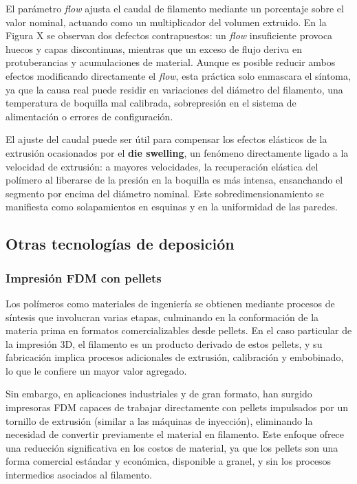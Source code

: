 El parámetro \textit{flow} ajusta el caudal de filamento mediante un porcentaje sobre el valor nominal, actuando como un multiplicador del volumen extruido. En la Figura X se observan dos defectos contrapuestos: un \textit{flow} insuficiente provoca huecos y capas discontinuas, mientras que un exceso de flujo deriva en protuberancias y acumulaciones de material. Aunque es posible reducir ambos efectos modificando directamente el \textit{flow}, esta práctica solo enmascara el síntoma, ya que la causa real puede residir en variaciones del diámetro del filamento, una temperatura de boquilla mal calibrada, sobrepresión en el sistema de alimentación o errores de configuración.

El ajuste del caudal puede ser útil para compensar los efectos elásticos de la extrusión ocasionados por el \textbf{die swelling}, un fenómeno directamente ligado a la velocidad de extrusión: a mayores velocidades, la recuperación elástica del polímero al liberarse de la presión en la boquilla es más intensa, ensanchando el segmento por encima del diámetro nominal.
Este sobredimensionamiento se manifiesta como solapamientos en esquinas y en la uniformidad de las paredes. 

\subsection{Otras tecnologías de deposición}

\subsubsection{Impresión FDM con pellets}

Los polímeros como materiales de ingeniería se obtienen mediante procesos de síntesis que involucran varias etapas, culminando en la conformación de la materia prima en formatos comercializables desde pellets. En el caso particular de la impresión 3D, el filamento es un producto derivado de estos pellets, y su fabricación implica procesos adicionales de extrusión, calibración y embobinado, lo que le confiere un mayor valor agregado.

Sin embargo, en aplicaciones industriales y de gran formato, han surgido impresoras FDM capaces de trabajar directamente con pellets impulsados por un tornillo de extrusión (similar a las máquinas de inyección), eliminando la necesidad de convertir previamente el material en filamento. Este enfoque ofrece una reducción significativa en los costos de material, ya que los pellets son una forma comercial estándar y económica, disponible a granel, y sin los procesos intermedios asociados al filamento.


